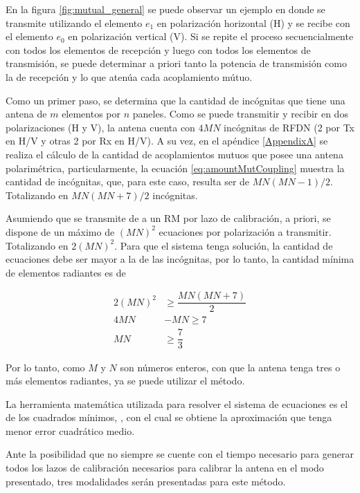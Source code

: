 En la figura \ref{fig:mutual_general} se puede observar un ejemplo en donde se transmite utilizando el elemento $e_1$ en 
polarización horizontal (H) y se recibe con el elemento $e_0$ en polarización vertical (V). Si se repite el proceso 
secuencialmente con todos los elementos de recepción y luego con todos los elementos de transmisión, se puede determinar a 
priori tanto la potencia de transmisión como la de recepción y lo que atenúa cada acoplamiento mútuo.

Como un primer paso, se determina que la cantidad de incógnitas que tiene una antena de $m$ elementos por $n$ paneles. Como 
se puede transmitir y recibir en dos polarizaciones (H y V), la antena cuenta con $4MN$ incógnitas de RFDN (2 por Tx en H/V y 
otras 2 por Rx en H/V). A su vez, en el apéndice \ref{AppendixA} se realiza el cálculo de la cantidad de acoplamientos mutuos
que posee una antena polarimétrica, particularmente, la ecuación \ref{eq:amountMutCoupling} muestra la cantidad de 
incógnitas, que, para este caso, resulta ser de $MN(MN-1)/2$. Totalizando en $MN(MN + 7)/2$ incógnitas.

Asumiendo que se transmite de a un RM por lazo de calibración, a priori, se dispone de un máximo de $(MN)^2$ ecuaciones por
polarización a transmitir. Totalizando en $2(MN)^2$. Para que el sistema tenga solución, la cantidad de ecuaciones debe ser 
mayor a la de las incógnitas, por lo tanto, la cantidad mínima de elementos radiantes es de

$$
\begin{aligned}
	2(MN)^2 &\ge  \dfrac{MN(MN + 7)}{2} \\
	4MN &- MN \ge7 \\
	MN &\ge \dfrac{7}{3}
\end{aligned}
$$

Por lo tanto, como $M$ y $N$ son números enteros, con que la antena tenga tres o más elementos radiantes, ya se puede utilizar el método.

La herramienta matemática utilizada para resolver el sistema de ecuaciones es el de los cuadrados mínimos, 
, con el cual se obtiene la aproximación que tenga menor error cuadrático medio. 

Ante la posibilidad que no siempre se cuente con el tiempo necesario para generar todos los lazos de calibración necesarios 
para calibrar la antena en el modo presentado, tres modalidades serán presentadas para este método. 


